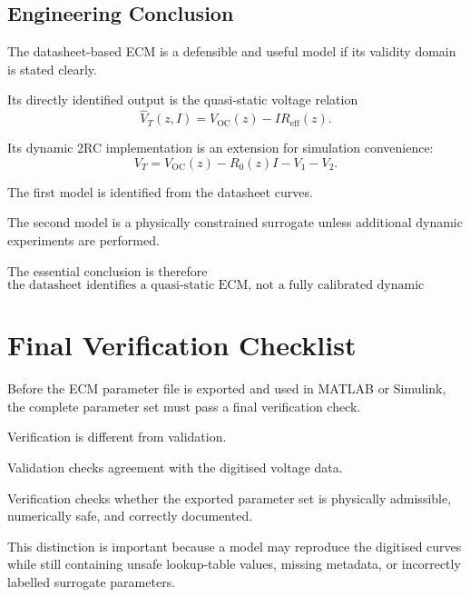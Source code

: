 \documentclass[a4paper,12pt]{article}
\begin{document}
\subsection{Engineering Conclusion}

The datasheet-based ECM is a defensible and useful model if its validity domain is stated clearly.

Its directly identified output is the quasi-static voltage relation
\begin{equation}
\boxed{
\hat{V}_T(z,I)
=
V_{\mathrm{OC}}(z)
-
IR_{\mathrm{eff}}(z).
}
\label{eq:interp_final_static_model}
\end{equation}

Its dynamic 2RC implementation is an extension for simulation convenience:
\begin{equation}
\boxed{
V_T
=
V_{\mathrm{OC}}(z)
-
R_0(z)I
-
V_1
-
V_2.
}
\label{eq:interp_final_dynamic_model}
\end{equation}

The first model is identified from the datasheet curves.

The second model is a physically constrained surrogate unless additional dynamic experiments are performed.

The essential conclusion is therefore
\begin{equation}
\boxed{
\text{the datasheet identifies a quasi-static ECM, not a fully calibrated dynamic Thevenin ECM.}
}
\label{eq:interp_final_conclusion}
\end{equation}

\clearpage
\newpage
\section{Final Verification Checklist}
\label{sec:final_verification_checklist}

Before the ECM parameter file is exported and used in MATLAB or Simulink, the complete parameter set must pass a final verification check.

Verification is different from validation.

Validation checks agreement with the digitised voltage data.

Verification checks whether the exported parameter set is physically admissible, numerically safe, and correctly documented.

This distinction is important because a model may reproduce the digitised curves while still containing unsafe lookup-table values, missing metadata, or incorrectly labelled surrogate parameters.
\end{document}
